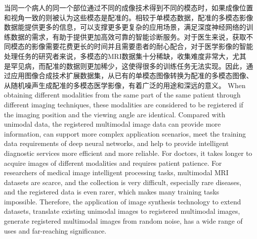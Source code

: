 \documentclass[letterpaper]{article} %
\begin{document}
当同一个病人的同一个部位通过不同的成像技术得到不同的模态时，如果成像位置和视角一致的则被认为这些模态是配准的。相较于单模态数据，配准的多模态影像数据能提供更多的信息，可以支撑更多更复杂的应用场景，满足深度神经网络的训练数据的需求，有助于提供更加高效可靠的智能诊断服务。对于医生来说，获取不同模态的影像需要花费更长的时间并且需要患者的耐心配合，对于医学影像的智能处理任务的研究者来说，多模态的MRI数据集十分稀缺，收集难度非常大，尤其是罕见病，而配准的数据则更加稀少，这使得很多的训练任务无法实现。因此，通过应用图像合成技术扩展数据集，从已有的单模态图像转换为配准的多模态图像、从随机噪声生成配准的多模态医学影像，有着广泛的用途和深远的意义。
When obtaining different modalities from the same part of the same patient  through different imaging techniques, these modalities are considered to be registered if the imaging position and the viewing angle are identical.  Compared with unimodal data, the registered multimodal image data can provide more information, can support more complex application scenarios, meet the training data requirements of deep neural networks, and help to provide  intelligent diagnostic services more efficient and more reliable. For doctors, it takes longer to acquire images of different modalities and requires patient patience. For researchers of medical image intelligent processing tasks, multimodal MRI datasets are scarce, and the collection is very difficult, especially rare diseases, and the registered data is even rarer, which makes many training tasks impossible. Therefore, the application of image synthesis technology to extend datasets, translate existing unimodal images to registered multimodal images, generate registered multimodal images from random noise, has a wide range of uses and far-reaching significance.
\end{document}
